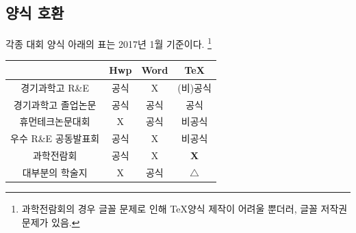 \documentclass[12pt]{beamer}
\begin{document}
\subsection{양식 호환}
\begin{frame}{각종 대회 양식}
	아래의 표는
	2017년 1월 %
	기준이다. \footnote{과학전람회의 경우 글꼴 문제로 인해 \TeX 양식 제작이 어려울 뿐더러, 글꼴 저작권 문제가 있음.}
	\begin{footnotesize}
		\begin{table}
			\centering
			\begin{tabular}{|c|c|c|c|}
				\hline
				& Hwp & Word & TeX \\
				\hline
				\hline
				경기과학고 R\&E & 공식 & X & (비)공식 \\
				\hline
				경기과학고 졸업논문 & 공식 & 공식 & 공식 \\
				\hline
				휴먼테크논문대회 & X & 공식 & 비공식 \\
				\hline
				우수 R\&E 공동발표회 & 공식 & X & 비공식 \\
				\hline
				과학전람회 & 공식 & X & \textbf{X} \\
				\hline
				대부분의 학술지 & X & 공식 & $ \triangle $ \\
				\hline
			\end{tabular}
		\end{table}
	\end{footnotesize}
\end{frame}
\end{document}
